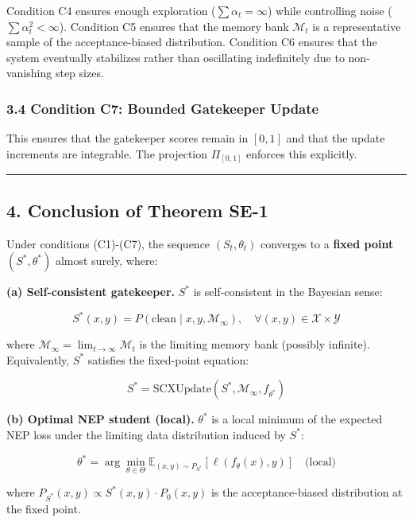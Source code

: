 \documentclass[
  12pt,
]{article}
\begin{document}
Condition C4 ensures enough exploration (\(\sum \alpha_t = \infty\))
while controlling noise (\(\sum \alpha_t^2 < \infty\)). Condition C5
ensures that the memory bank \(\mathcal{M}_t\) is a representative
sample of the acceptance-biased distribution. Condition C6 ensures that
the system eventually stabilizes rather than oscillating indefinitely
due to non-vanishing step sizes.

\subsubsection{3.4 Condition C7: Bounded Gatekeeper
Update}\label{condition-c7-bounded-gatekeeper-update}

This ensures that the gatekeeper scores remain in \([0,1]\) and that the
update increments are integrable. The projection \(\Pi_{[0,1]}\)
enforces this explicitly.

\begin{center}\rule{0.5\linewidth}{0.5pt}\end{center}

\subsection{4. Conclusion of Theorem
SE-1}\label{conclusion-of-theorem-se-1}

Under conditions (C1)-(C7), the sequence \((S_t, \theta_t)\) converges
to a \textbf{fixed point} \((S^*, \theta^*)\) almost surely, where:

\textbf{(a) Self-consistent gatekeeper.} \(S^*\) is self-consistent in
the Bayesian sense:

\[
S^*(x,y) = P(\text{clean} \mid x, y, \mathcal{M}_\infty), \quad \forall (x,y) \in \mathcal{X} \times \mathcal{Y}
\]

where \(\mathcal{M}_\infty = \lim_{t \to \infty} \mathcal{M}_t\) is the
limiting memory bank (possibly infinite). Equivalently, \(S^*\)
satisfies the fixed-point equation:

\[
S^* = \text{SCXUpdate}(S^*, \mathcal{M}_\infty, f_{\theta^*})
\]

\textbf{(b) Optimal NEP student (local).} \(\theta^*\) is a local
minimum of the expected NEP loss under the limiting data distribution
induced by \(S^*\):

\[
\theta^* = \arg\min_{\theta \in \Theta} \mathbb{E}_{(x,y) \sim P_{S^*}}[\ell(f_\theta(x), y)] \quad \text{(local)}
\]

where \(P_{S^*}(x,y) \propto S^*(x,y) \cdot P_0(x,y)\) is the
acceptance-biased distribution at the fixed point.
\end{document}
